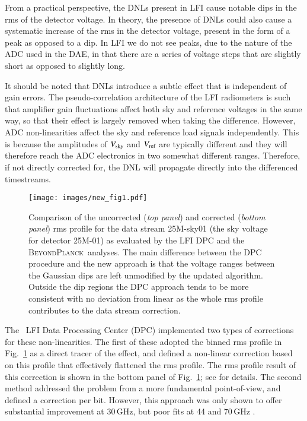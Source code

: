 \documentclass[twocolumn]{aa}
\newcommand{\BP}{\textsc{BeyondPlanck}}
\begin{document}
From a practical perspective, the DNLs present in LFI cause notable dips in the rms of the detector voltage. In theory, the presence of DNLs could also cause a systematic increase of the rms in the detector voltage, present in the form of a peak as opposed to a dip. In LFI we do not see peaks, due to the nature of the ADC used in the DAE, in that there are a series of voltage steps that are slightly short as opposed to slightly long.

It should be noted that DNLs introduce a subtle effect that is independent of gain errors. The pseudo-correlation architecture of the LFI radiometers \citep{bersanelli2010} is such that amplifier gain fluctuations affect both sky and reference voltages in the same way, so that their effect is largely removed when taking the difference. However, ADC non-linearities affect the sky and reference load signals independently. This is because the amplitudes of $V_{\rm sky}$ and $V_{\rm ref}$ are typically different and they will therefore reach the ADC electronics in two somewhat different ranges. Therefore, if not directly corrected for, the DNL will propagate directly into the differenced timestreams.

\begin{figure}[t]
\texttt{[image: images/new\_fig1.pdf]}
\caption{Comparison of the uncorrected (\emph{top panel}) and
  corrected (\emph{bottom panel}) rms profile for the data stream 25M-sky01 (the sky voltage for detector 25M-01) as evaluated by the LFI DPC and the \BP\ analyses. The main difference
  between the DPC procedure and the new approach is that the voltage
  ranges between the Gaussian dips are left unmodified by the updated
  algorithm. Outside the dip regions the DPC approach tends to be more consistent with no deviation from linear as the whole rms profile contributes to the data stream correction. }
\label{fig:DPC_correction}
\end{figure}

The \Planck\ LFI Data Processing Center (DPC) implemented two types of corrections for these non-linearities. The first of these adopted the binned rms profile in Fig.~\ref{fig:DPC_correction} as a direct tracer of the effect, and defined a non-linear correction based on this profile that effectively flattened the rms profile. The rms profile result of this correction is shown in the bottom panel of Fig.~\ref{fig:DPC_correction}; see \citet{planck2013-p02a} for details. The second method addressed the problem from a more fundamental point-of-view, and defined a correction per bit. However, this approach was only shown to offer substantial improvement at 30\,GHz, but poor fits at 44 and 70\,GHz \citep{planck2016-l02}.
\end{document}
